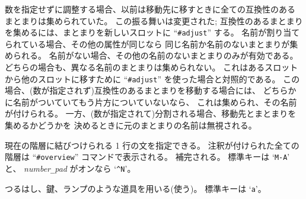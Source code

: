 数を指定せずに調整する場合、以前は移動先に移すときに全ての互換性のある
まとまりは集められていた。
この振る舞いは変更された;
互換性のあるまとまりを集めるには、まとまりを新しいスロットに
``{\tt \#adjust}'' する。
名前が割り当てられている場合、その他の属性が同じなら
同じ名前か名前のないまとまりが集められる。
名前がない場合、その他の名前のないまとまりのみが有効である。
どちらの場合も、異なる名前のまとまりは集められない。
これはあるスロットから他のスロットに移すために
``{\tt \#adjust}'' を使った場合と対照的である。
この場合、(数が指定されず)互換性のあるまとまりを移動する場合には、
どちらかに名前がついていてもう片方についていないなら、
これは集められ、その名前が付けられる。
一方、(数が指定されて)分割される場合、移動先とまとまりを集めるかどうかを
決めるときに元のまとまりの名前は無視される。
\item[\tb{\#annotate}]
現在の階層に結びつけられる 1 行の文を指定できる。
注釈が付けられた全ての階層は
``{\tt \#overview}'' コマンドで表示される。
補完される。
標準キーは `{\tt M-A}' と、
{\it number\verb+_+pad\/} がオンなら `{\tt \^{}N}'。
\item[\tb{\#apply}]
つるはし、鍵、ランプのような道具を用いる(使う)。
標準キーは `{\tt a}'。\\
